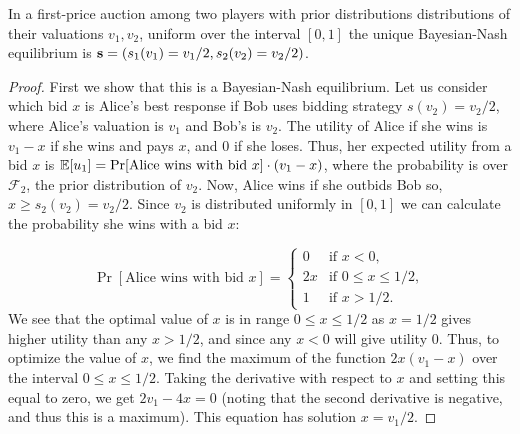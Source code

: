 \documentclass[12pt,twoside]{reedthesis}
\begin{document}
\begin{prop}
	In a first-price auction among two players with prior distributions distributions of their valuations $v_1,v_2$, uniform over the interval $[0,1]$ the unique Bayesian-Nash equilibrium is $\textbf{s} = (s_1(v_1) = v_1 / 2, s_2(v_2) = v_2 / 2)$.
\end{prop}

\begin{proof}{\citep{Nisan2007}}
	First we show that this is a Bayesian-Nash equilibrium. Let us consider which bid $x$ is Alice's best response if Bob uses bidding strategy $s(v_2) = v_2/2$, where Alice's valuation is $v_1$ and Bob's is $v_2$. The utility of Alice if she wins is $v_1 - x$ if she wins and pays $x$, and $0$ if she loses. Thus, her expected utility from a bid $x$ is $\mathbb{E}[u_1] = \Pr[\text{Alice wins with bid } x] \cdot (v_1 -x)$, where the probability is over $\mathcal{F}_2$, the prior distribution of $v_2$. Now, Alice wins if she outbids Bob so, $x \geq s_2(v_2) = v_2 / 2$. Since $v_2$ is distributed uniformly in $[0,1]$ we can calculate the probability she wins with a bid $x$: 
	
	\[
	\Pr[\text{Alice wins with bid } x] =
	\begin{cases}
	0 & \text{if } x < 0, \\
	2x & \text{if } 0 \leq x \leq 1/2,\\
	1 & \text{if } x > 1/2.
	\end{cases}
	\]
We see that the optimal value of $x$ is in range $0 \leq x \leq 1/2$ as $x = 1/2$ gives higher utility than any $x > 1/2$, and since any $x < 0$ will give utility $0$. Thus, to optimize the value of $x$, we find the maximum of the function $2x(v_1 - x)$ over the interval $0 \leq x \leq 1/2$. Taking the derivative with respect to $x$ and setting this equal to zero, we get $2v_1 - 4x = 0$ (noting that the second derivative is negative, and thus this is a maximum). This equation has solution $x = v_1/2$.
\end{proof}
\end{document}
